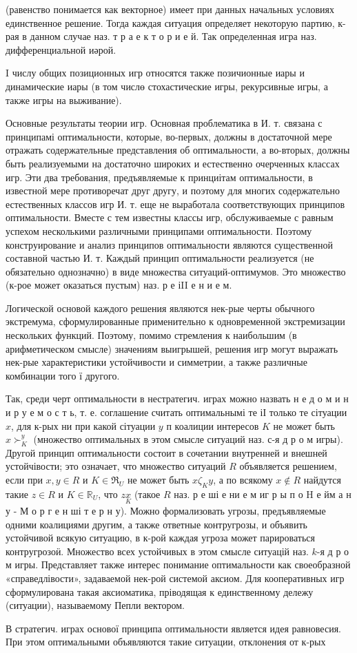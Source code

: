 \documentclass[10pt]{article}
\begin{document}
(равенство понимается как векторное) имеет при данных начальных условиях единственное решение. Тогда каждая ситуация определяет некоторую партию, к-рая в данном случае наз. т р а е к т о р и е й. Так определенная игра наз. дифференциальной иәрой.



I числу общих позиционных игр относятся также позичионные иары и динамические иары (в том числө стохастические игры, рекурсивные игры, а также игры на выживание).



Основные результаты теории игр. Основная проблематика в И. т. связана с принципамі оптимальности, которые, во-первых, должны в достаточной мере отражать содержательные представления об оптимальности, а во-вторых, должны быть реализуемыми на достаточно широких и естественно очерченных классах игр. Эти два требования, предъявляемые к принциітам оптимальности, в известной мере противоречат друг другу, и поэтому для многих содержательно естественных классов игр И. т. еще не выработала соответствующих принципов оптимальности. Вместе с тем известны классы игр, обслуживаемые с равным успехом несколькими различными принципами оптимальности. Поэтому конструирование и анализ принципов оптимальности являются существенной составной частью И. т. Каждый принцип оптимальности реализуется (не обязательно однозначно) в виде множества ситуаций-оптимумов. Это множество (к-рое может оказаться пустым) наз. р е іII е н и е м.



Логической основой каждого решения являются нек-рые черты обычного экстремума, сформулированные применительно к одновременной экстремизации нескольких функций. Поэтому, помимо стремления к наибольшим (в арифметическом смысле) значениям выигрышей, решения игр могут выражать нек-рые характеристики устойчивости и симметрии, а также различные комбинации того ї другого.



Так, среди черт оптимальности в нестратегич. играх можно назвать н е д о м и н и р у е м о с т ь, т. е. соглашение считать оптимальнымі те іІ только те сітуации $x$, для к-рых ни при какой сітуации $y$ п коалиции интересов $K$ не может быть $x \succ_{K}^{y}$ (множество оптимальных в этом смысле ситуаций наз. $с$-я д р о м игры). Другой принцип оптимальности состоит в сочетании внутренней и внешней устойчівости; это означает, что множество ситуаций $R$ объявляется решением, если при $x, y \in R$ и $K \in \mathfrak{R}_{U}$ не может быть $x \zeta_{K} y$, а по всякому $x \notin R$ найдутся такие $z \in R$ и $K \in \mathbb{R}_{U}$, что $z \underset{K}{x}$ (такое $R$ наз. р е ші е ни е м иг р ы п о $\mathrm{H}$ е йм а н у - М о р г е н ші т е р н у). Можно формализовать угрозы, предъявляемые одними коалициями другим, а также ответные контругрозы, и объявить устойчивой всякую ситуацию, в к-рой каждая угроза может парироваться контругрозоӥ. Множество всех устойчивых в этом смысле ситуацій наз. $k$-я д р о м игры. Представляет также интерес понимание оптимальности как своеобразной «справедлівости», задаваемой нек-рой системой аксиом. Для кооперативных игр сформулирована такая аксиоматика, пріводящая к единственному дележу (ситуации), называемому Пепли вектором.



В стратегич. играх основої принципа оптимальности является идея равновесия. При этом оптимальными объявляются такие ситуации, отклонения от к-рых
\end{document}
